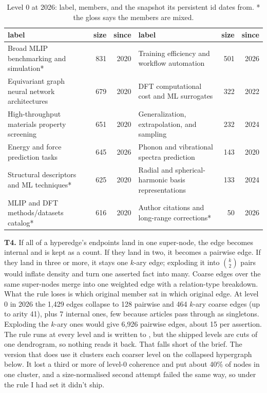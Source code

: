 \documentclass[10pt,a4paper]{article}
\newcommand{\code}[1]{\texttt{\small\detokenize{#1}}}
\newcommand{\para}[1]{\textbf{#1}\hspace{0.4em}}
\begin{document}
\begin{table}[h]
\centering\footnotesize
\caption{Level 0 at 2026: label, members, and the snapshot its persistent id dates from. * the gloss says
the members are mixed.}
\label{tab:level0}
\begin{tabular}{@{}lrr@{\hspace{1.6em}}lrr@{}}
\toprule
label & size & since & label & size & since \\
\midrule
Broad MLIP benchmarking and simulation* & 831 & 2020 & Training efficiency and workflow automation & 501 & 2026 \\
Equivariant graph neural network architectures & 679 & 2020 & DFT computational cost and ML surrogates & 322 & 2022 \\
High-throughput materials property screening & 651 & 2020 & Generalization, extrapolation, and sampling & 232 & 2024 \\
Energy and force prediction tasks & 645 & 2026 & Phonon and vibrational spectra prediction & 143 & 2020 \\
Structural descriptors and ML techniques* & 625 & 2020 & Radial and spherical-harmonic basis representations & 133 & 2024 \\
MLIP and DFT methods/datasets catalog* & 616 & 2020 & Author citations and long-range corrections* & 50 & 2026 \\
\bottomrule
\end{tabular}
\end{table}

\para{T4.} If all of a hyperedge's endpoints land in one super-node, the edge becomes internal and is kept
as a count. If they land in two, it becomes a pairwise edge. If they land in three or more, it stays one
$k$-ary edge; exploding it into $\binom{k}{2}$ pairs would inflate density and turn one asserted fact into
many. Coarse edges over the same super-nodes merge into one weighted edge with a relation-type breakdown.
What the rule loses is which original member sat in which original edge. At level 0 in 2026 the 1,429
edges collapse to 128 pairwise and 464 $k$-ary coarse edges (up to arity 41), plus 7 internal ones, few
because articles pass through as singletons. Exploding the $k$-ary ones would give 6,926 pairwise edges,
about 15 per assertion. The rule runs at every level and is written to \code{hierarchy.json}, but the
shipped levels are cuts of one dendrogram, so nothing reads it back. That falls short of the brief. The
version that does use it clusters each coarser level on the collapsed hypergraph below. It lost a third
or more of level-0 coherence and put about 40\% of nodes in one cluster, and a size-normalised second
attempt failed the same way, so under the rule I had set it didn't ship.
\end{document}
